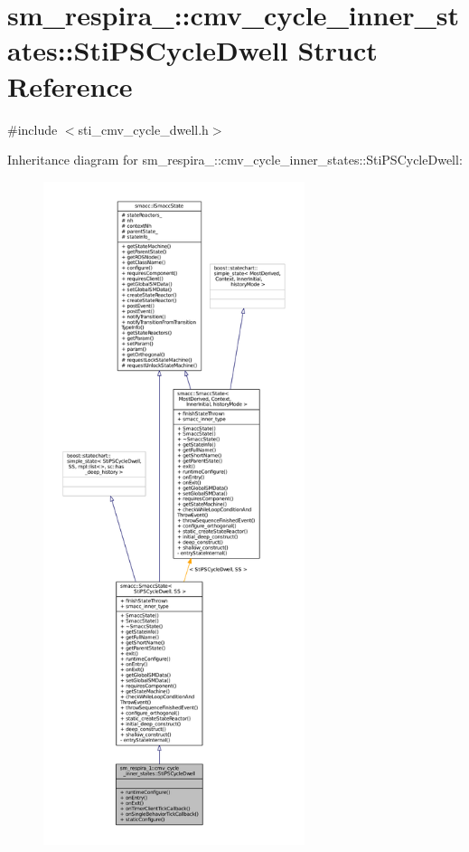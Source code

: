 \hypertarget{structsm__respira__1_1_1cmv__cycle__inner__states_1_1StiPSCycleDwell}{}\section{sm\+\_\+respira\+\_\+:\+:cmv\+\_\+cycle\+\_\+inner\+\_\+states\+:\+:Sti\+P\+S\+Cycle\+Dwell Struct Reference}
\label{structsm__respira__1_1_1cmv__cycle__inner__states_1_1StiPSCycleDwell}


{\ttfamily \#include $<$sti\+\_\+cmv\+\_\+cycle\+\_\+dwell.\+h$>$}



Inheritance diagram for sm\+\_\+respira\+\_\+:\+:cmv\+\_\+cycle\+\_\+inner\+\_\+states\+:\+:Sti\+P\+S\+Cycle\+Dwell\+:
\nopagebreak
\begin{figure}[H]
\begin{center}
\leavevmode
\includegraphics[height=550pt]{structsm__respira__1_1_1cmv__cycle__inner__states_1_1StiPSCycleDwell__inherit__graph}
\end{center}
\end{figure}


